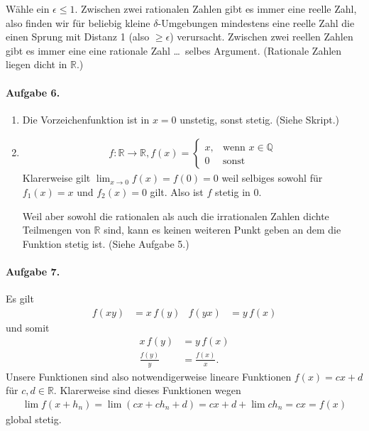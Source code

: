\documentclass{article}
\begin{document}
Wähle ein $\epsilon \leq 1$. Zwischen zwei rationalen Zahlen gibt es immer eine reelle Zahl, also finden wir für beliebig kleine $\delta$-Umgebungen mindestens eine reelle Zahl die einen Sprung mit Distanz 1 (also $\geq \epsilon$) verursacht. Zwischen zwei reellen Zahlen gibt es immer eine eine rationale Zahl \ldots\ selbes Argument. (Rationale Zahlen liegen dicht in $\mathbb{R}$.)

\paragraph{Aufgabe 6.}
\begin{enumerate}
    \item Die Vorzeichenfunktion ist in $x = 0$ unstetig, sonst stetig. (Siehe Skript.)
    \item \begin{align*}
        f: \mathbb{R} \rightarrow \mathbb{R}, f(x) = \begin{cases}
            x, & \text{wenn $x \in \mathbb{Q}$} \\
            0 & \text{sonst}
        \end{cases}
    \end{align*}
    Klarerweise gilt $\lim_{x \to 0} f(x) = f(0) = 0$ weil selbiges sowohl für $f_1(x) = x$ und $f_2(x) = 0$ gilt. Also ist $f$ stetig in 0.

    Weil aber sowohl die rationalen als auch die irrationalen Zahlen dichte Teilmengen von $\mathbb{R}$ sind, kann es keinen weiteren Punkt geben an dem die Funktion stetig ist. (Siehe Aufgabe 5.)
\end{enumerate}

\paragraph{Aufgabe 7.}
Es gilt
\begin{align*}
    f(xy) &= x\, f(y) & f(yx) &= y\, f(x)
\end{align*}
und somit
\begin{align*}
    x\, f(y) &= y\, f(x) \\
    \frac{f(y)}{y} &= \frac{f(x)}{x}.
\end{align*}
Unsere Funktionen sind also notwendigerweise lineare Funktionen $f(x) = cx + d$ für $c, d \in \mathbb{R}$. Klarerweise sind dieses Funktionen wegen
\begin{align*}
    \lim f(x + h_n) = \lim (cx + ch_n + d) = cx + d + \lim ch_n = cx = f(x)
\end{align*}
global stetig.
\end{document}
